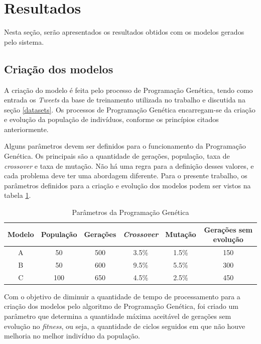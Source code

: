 \documentclass[12pt]{article}
\begin{document}
\section{Resultados}

Nesta seção, serão apresentados os resultados obtidos com os modelos gerados pelo sistema. 

\subsection{Criação dos modelos}

A criação do modelo é feita pelo processo de Programação Genética, tendo como entrada os \emph{Tweets} da base de treinamento utilizada no trabalho e discutida na seção \ref{datasets}. Os processos de Programação Genética encarregam-se da criação e evolução da população de indivíduos, conforme os princípios citados anteriormente.

Alguns parâmetros devem ser definidos para o funcionamento da Programação Genética. Os principais são a quantidade de gerações, população, taxa de \emph{crossover} e taxa de mutação. Não há uma regra para a definição desses valores, e cada problema deve ter uma abordagem diferente. Para o presente trabalho, os parâmetros definidos para a criação e evolução dos modelos podem ser vistos na tabela \ref{parametersGP}.

\begin{table}[H]
	\centering
	\begin{tabular}{cccccc}
	\textbf{Modelo} & \textbf{População} & \textbf{Gerações} & \textbf{\emph{Crossover}} & \textbf{Mutação} & \textbf{Gerações sem evolução} \\ \hline
	A & 50 & 500 & 3.5\% & 1.5\% & 150 \\ \hline
	B & 50 & 600 & 9.5\% & 5.5\% & 300 \\ \hline
	C & 100 & 650 & 4.5\% & 2.5\% & 450 \\ \hline
	\end{tabular}
	\caption{Parâmetros da Programação Genética}
	\label{parametersGP}
\end{table}

Com o objetivo de diminuir a quantidade de tempo de processamento para a criação dos modelos pelo algoritmo de Programação Genética, foi criado um parâmetro que determina a quantidade máxima aceitável de gerações sem evolução no \emph{fitness}, ou seja, a quantidade de ciclos seguidos em que não houve melhoria no melhor indivíduo da população. 
\end{document}
